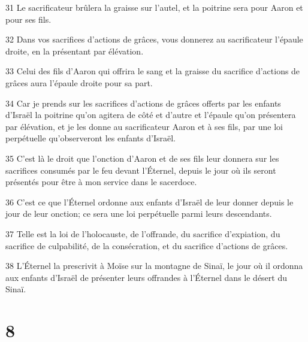 \par 31 Le sacrificateur brûlera la graisse sur l'autel, et la poitrine sera pour Aaron et pour ses fils.
\par 32 Dans vos sacrifices d'actions de grâces, vous donnerez au sacrificateur l'épaule droite, en la présentant par élévation.
\par 33 Celui des fils d'Aaron qui offrira le sang et la graisse du sacrifice d'actions de grâces aura l'épaule droite pour sa part.
\par 34 Car je prends sur les sacrifices d'actions de grâces offerts par les enfants d'Israël la poitrine qu'on agitera de côté et d'autre et l'épaule qu'on présentera par élévation, et je les donne au sacrificateur Aaron et à ses fils, par une loi perpétuelle qu'observeront les enfants d'Israël.
\par 35 C'est là le droit que l'onction d'Aaron et de ses fils leur donnera sur les sacrifices consumés par le feu devant l'Éternel, depuis le jour où ils seront présentés pour être à mon service dans le sacerdoce.
\par 36 C'est ce que l'Éternel ordonne aux enfants d'Israël de leur donner depuis le jour de leur onction; ce sera une loi perpétuelle parmi leurs descendants.
\par 37 Telle est la loi de l'holocauste, de l'offrande, du sacrifice d'expiation, du sacrifice de culpabilité, de la consécration, et du sacrifice d'actions de grâces.
\par 38 L'Éternel la prescrivit à Moïse sur la montagne de Sinaï, le jour où il ordonna aux enfants d'Israël de présenter leurs offrandes à l'Éternel dans le désert du Sinaï.

\chapter{8}


